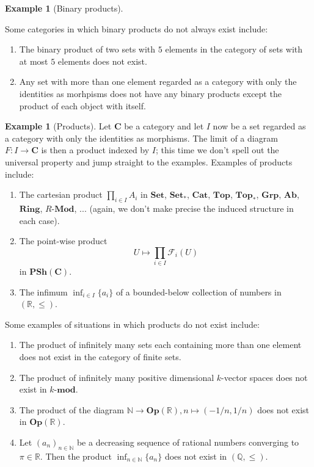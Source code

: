 \documentclass[12pt,a4paper]{amsart}
\theoremstyle{plain}
\theoremstyle{definition}
\newtheorem{exmp}[thm]{Example}
\theoremstyle{remark}
\begin{document}
\begin{exmp}[Binary products]
\begin{enumerate}
  \end{enumerate}
  Some categories in which binary products do not always exist include:
  \begin{enumerate}
    \item The binary product of two sets with $5$ elements in the category of sets with at most $5$ elements does not exist.
    \item Any set with more than one element regarded as a category with only the identities as morhpisms does not have any binary products except the product of each object with itself.
  \end{enumerate}
\end{exmp}

\begin{exmp}[Products]
  Let $\mathbf{C}$ be a category and let $I$ now be a set regarded as a category with only the identities as morphisms.
  The limit of a diagram $F \colon I \to \mathbf{C}$ is then a product indexed by $I$; this time we don't spell out the universal property and jump straight to the examples.
  Examples of products include:
  \begin{enumerate}
    \item The cartesian product $\prod_{i \in I} A_{i}$ in $\mathbf{Set}$, $\mathbf{Set}_{*}$, $\mathbf{Cat}$, $\mathbf{Top}$, $\mathbf{Top}_{*}$, $\mathbf{Grp}$, $\mathbf{Ab}$, $\mathbf{Ring}$, $R$-$\mathbf{Mod}$, ... (again, we don't make precise the induced structure in each case).
    \item The point-wise product
      \[ U \mapsto \prod_{i \in I} \mathscr{F}_{i}(U) \]
      in $\mathbf{PSh}(\mathbf{C})$.
    \item The infimum $\operatorname{inf}_{i \in I} \{ a_{i} \}$ of a bounded-below collection of numbers in $(\mathbb{R}, \leq)$.
  \end{enumerate}
  Some examples of situations in which products do not exist include:
  \begin{enumerate}
    \item The product of infinitely many sets each containing more than one element does not exist in the category of finite sets.
    \item The product of infinitely many positive dimensional $k$-vector spaces does not exist in $k$-$\mathbf{mod}$.
    \item The product of the diagram $\mathbb{N} \to \mathbf{Op}(\mathbb{R}), n \mapsto (-1/n,1/n)$ does not exist in $\mathbf{Op}(\mathbb{R})$.
    \item Let $(a_{n})_{n \in \mathbb{N}}$ be a decreasing sequence of rational numbers converging to $\pi \in \mathbb{R}$.
      Then the product $\operatorname{inf}_{n \in \mathbb{N}} \{ a_{n} \}$ does not exist in $(\mathbb{Q}, \leq)$.
  \end{enumerate}
\end{exmp}
\end{document}
